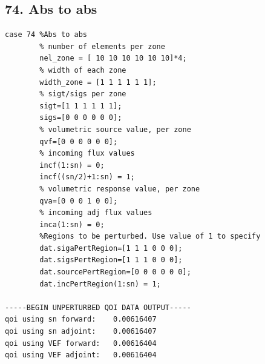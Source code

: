 \documentclass{article}
\begin{document}
\subsection{74. Abs to abs}
\begin{verbatim}
case 74 %Abs to abs
        % number of elements per zone
        nel_zone = [ 10 10 10 10 10 10]*4;
        % width of each zone
        width_zone = [1 1 1 1 1 1];
        % sigt/sigs per zone
        sigt=[1 1 1 1 1 1];
        sigs=[0 0 0 0 0 0];
        % volumetric source value, per zone
        qvf=[0 0 0 0 0 0];
        % incoming flux values
        incf(1:sn) = 0;
        incf((sn/2)+1:sn) = 1;
        % volumetric response value, per zone
        qva=[0 0 0 1 0 0];
        % incoming adj flux values
        inca(1:sn) = 0;
        %Regions to be perturbed. Use value of 1 to specify
        dat.sigaPertRegion=[1 1 1 0 0 0];
        dat.sigsPertRegion=[1 1 1 0 0 0];
        dat.sourcePertRegion=[0 0 0 0 0 0];
        dat.incPertRegion(1:sn) = 1; 
        
-----BEGIN UNPERTURBED QOI DATA OUTPUT----- 
qoi using sn forward: 	 0.00616407 
qoi using sn adjoint: 	 0.00616407 
qoi using VEF forward: 	 0.00616404 
qoi using VEF adjoint: 	 0.00616404 
\end{verbatim}
\end{document}
